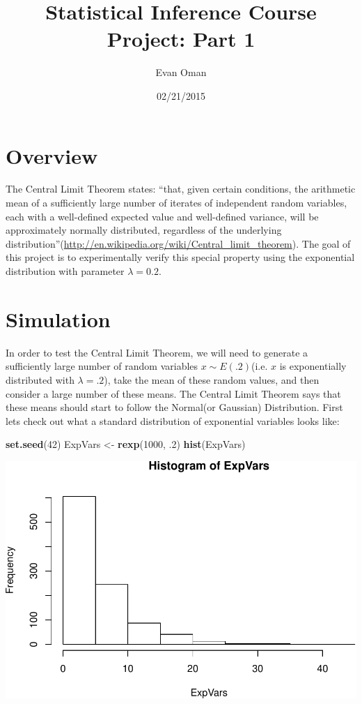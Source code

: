 \documentclass[]{article}
\title{Statistical Inference Course Project: Part 1}
\author{Evan Oman}
\date{02/21/2015}
\newenvironment{Shaded}{\begin{snugshade}}{\end{snugshade}}
\newcommand{\KeywordTok}[1]{\textcolor[rgb]{0.13,0.29,0.53}{\textbf{{#1}}}}
\newcommand{\DecValTok}[1]{\textcolor[rgb]{0.00,0.00,0.81}{{#1}}}
\newcommand{\StringTok}[1]{\textcolor[rgb]{0.31,0.60,0.02}{{#1}}}
\newcommand{\NormalTok}[1]{{#1}}
\begin{document}
\maketitle


\section{Overview}

The Central Limit Theorem states: ``that, given certain conditions, the
arithmetic mean of a sufficiently large number of iterates of
independent random variables, each with a well-defined expected value
and well-defined variance, will be approximately normally distributed,
regardless of the underlying
distribution''(\url{http://en.wikipedia.org/wiki/Central_limit_theorem}).
The goal of this project is to experimentally verify this special
property using the exponential distribution with parameter
\(\lambda = 0.2\).

\section{Simulation}

In order to test the Central Limit Theorem, we will need to generate a
sufficiently large number of random variables \(x \sim E(.2)\)(i.e.
\(x\) is exponentially distributed with \(\lambda = .2\)), take the mean
of these random values, and then consider a large number of these means.
The Central Limit Theorem says that these means should start to follow
the Normal(or Gaussian) Distribution. First lets check out what a
standard distribution of exponential variables looks like:
\vspace{-.1in}

\begin{Shaded}
\begin{Highlighting}[]
\KeywordTok{set.seed}\NormalTok{(}\DecValTok{42}\NormalTok{)}
\NormalTok{ExpVars <-}\StringTok{ }\KeywordTok{rexp}\NormalTok{(}\DecValTok{1000}\NormalTok{, .}\DecValTok{2}\NormalTok{)}
\KeywordTok{hist}\NormalTok{(ExpVars)}
\end{Highlighting}
\end{Shaded}

\includegraphics{SI-proj_files/figure-latex/unnamed-chunk-1-1.pdf}
\end{document}
